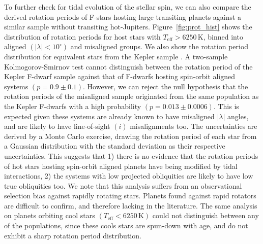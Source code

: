 \documentclass[useAMS,usenatbib]{mn2e}
\begin{document}
To further check for tidal evolution of the stellar spin, we can also compare the derived rotation periods of F-stars hosting large transiting planets against a similar sample without transiting hot-Jupiters. Figure~\ref{fig:prot_hist} shows the distribution of rotation periods for host stars with $T_\text{eff}>6250\,\text{K}$, binned into aligned $(|\lambda| < 10^\circ)$ and misaligned groups. We also show the rotation period distribution for equivalent stars from the Kepler sample \citep{2013A&amp;A...557L..10N}. A two-sample Kolmogorov-Smirnov test cannot distinguish between the rotation period of the Kepler F-dwarf sample against that of F-dwarfs hosting spin-orbit aligned systems $(p=0.9\pm0.1)$. However, we can reject the null hypothesis that the rotation periods of the misaligned sample originated from the same population as the Kepler F-dwarfs with a high probability $(p=0.013\pm0.0006)$. This is expected given these systems are already known to have misaligned $|\lambda|$ angles, and are likely to have line-of-sight $(i)$ misalignments too. The uncertainties are derived by a Monte Carlo exercise, drawing the rotation period of each star from a Gaussian distribution with the standard deviation as their respective uncertainties. This suggests that 1) there is no evidence that the rotation periods of hot stars hosting spin-orbit aligned planets have being modified by tidal interactions, 2) the systems with low projected obliquities are likely to have low true obliquities too. We note that this analysis suffers from an observational selection bias against rapidly rotating stars. Planets found against rapid rotators are difficult to confirm, and therefore lacking in the literature. The same analysis on planets orbiting cool stars $(T_\text{eff}<6250\,\text{K})$ could not distinguish between any of the populations, since these cools stars are spun-down with age, and do not exhibit a sharp rotation period distribution.
\end{document}
